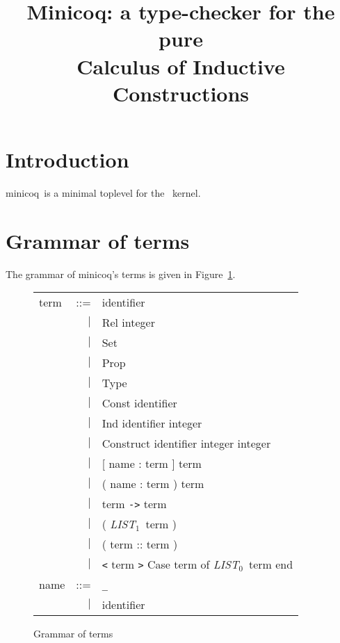 \documentclass{article}
\title{Minicoq: a type-checker for the pure \\
       Calculus of Inductive Constructions}
\newcommand{\minicoq}{\textsf{minicoq}}
\newcommand{\terminal}[1]{\textsf{#1}}
\newcommand{\listzero}{\textit{LIST$_0$}}
\newcommand{\listun}{\textit{LIST$_1$}}
\begin{document}
\maketitle

\section{Introduction}

\minicoq\ is a minimal toplevel for the \Coq\ kernel.


\section{Grammar of terms}

The grammar of \minicoq's terms is given in Figure~\ref{fig:terms}.

\begin{figure}[htbp]
  \hrulefill
  \begin{center}
    \begin{tabular}{lrl}
      term & ::= & identifier \\
           & $|$ & \terminal{Rel} integer \\
           & $|$ & \terminal{Set} \\
           & $|$ & \terminal{Prop} \\
           & $|$ & \terminal{Type} \\
           & $|$ & \terminal{Const} identifier \\
           & $|$ & \terminal{Ind} identifier integer \\
           & $|$ & \terminal{Construct} identifier integer integer \\
           & $|$ & \terminal{[} name \terminal{:} term
                   \terminal{]} term \\
           & $|$ & \terminal{(} name \terminal{:} term
                   \terminal{)} term \\
           & $|$ & term \verb!->! term \\
           & $|$ & \terminal{(} \listun\ term \terminal{)} \\
           & $|$ & \terminal{(} term \terminal{::} term \terminal{)} \\
           & $|$ & \verb!<! term \verb!>! \terminal{Case}
                   term \terminal{of} \listzero\ term \terminal{end}
      \\[1em]
      name & ::= & \verb!_! \\
           & $|$ & identifier
   \end{tabular}
  \end{center}
  \hrulefill
  \caption{Grammar of terms}
  \label{fig:terms}
\end{figure}
\end{document}
